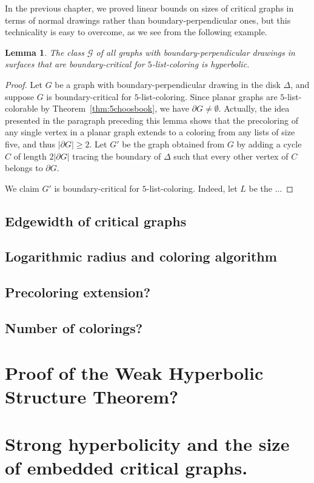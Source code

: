 \documentclass[12pt,twoside,openright,a4paper]{book}
\newtheorem{lemma}[theorem]{Lemma}
\newcommand{\GG}{\mathcal{G}}
\begin{document}
In the previous chapter, we proved linear bounds on sizes of critical graphs in terms of normal drawings rather than boundary-perpendicular ones,
but this technicality is easy to overcome, as we see from the following example.
\begin{lemma}
The class $\GG$ of all graphs with boundary-perpendicular drawings in surfaces that are boundary-critical for $5$-list-coloring
is hyperbolic.
\end{lemma}
\begin{proof}
Let $G$ be a graph with boundary-perpendicular drawing in the disk $\Delta$, and suppose $G$ is boundary-critical for $5$-list-coloring.
Since planar graphs are $5$-list-colorable by Theorem~\ref{thm:5choosbook}, we have $\partial G\neq\emptyset$.
Actually, the idea presented in the paragraph preceding this lemma shows that the precoloring of any single vertex in
a planar graph extends to a coloring from any lists of size five, and thus $|\partial G|\ge 2$.  Let $G'$ be the graph
obtained from $G$ by adding a cycle $C$ of length $2|\partial G|$ tracing the boundary of $\Delta$ such that every other
vertex of $C$ belongs to $\partial G$.

We claim $G'$ is boundary-critical for $5$-list-coloring.  Indeed, let $L$ be the ...
\end{proof}

\subsection{Edgewidth of critical graphs}
\subsection{Logarithmic radius and coloring algorithm}
\subsection{Precoloring extension?}
\subsection{Number of colorings?}

\section{Proof of the Weak Hyperbolic Structure Theorem?}

\section{Strong hyperbolicity and the size of embedded critical graphs.}
\end{document}
